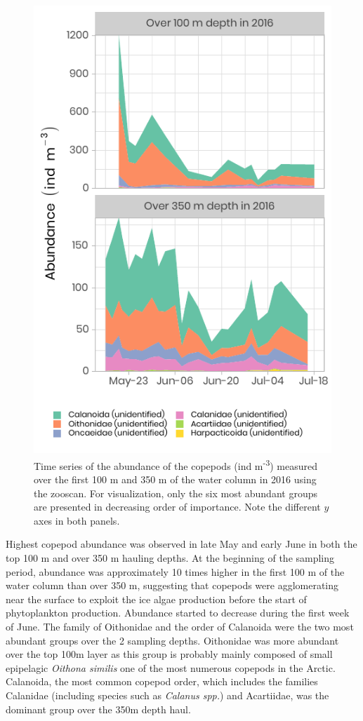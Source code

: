 \documentclass[essd, manuscript]{copernicus}
\begin{document}
\begin{figure}[H]
	\centering
	\includegraphics[scale = 1]{../../../graphs/fig14.pdf}
	\caption{Time series of the abundance of the copepods (ind m\textsuperscript{-3}) measured over the first 100 m and 350 m of the water column in 2016 using the zooscan. For visualization, only the six most abundant groups are presented in decreasing order of importance. Note the different $y$ axes in both panels.}
\end{figure}

Highest copepod abundance was observed in late May and early June in both the top 100 m and over 350 m hauling depths. At the beginning of the sampling period, abundance was approximately 10 times higher in the first 100 m of the water column than over 350 m, suggesting that copepods were agglomerating near the surface to exploit the ice algae production before the start of phytoplankton production. Abundance started to decrease during the first week of June. The family of Oithonidae and the order of Calanoida were the two most abundant groups over the 2 sampling depths. Oithonidae was more abundant over the top 100m layer as this group is probably mainly composed of small epipelagic \textit{Oithona similis} one of the most numerous copepods in the Arctic. Calanoida, the most common copepod order, which includes the families Calanidae (including species such as \textit{Calanus spp.}) and Acartiidae, was the dominant group over the 350m depth haul.
\end{document}
